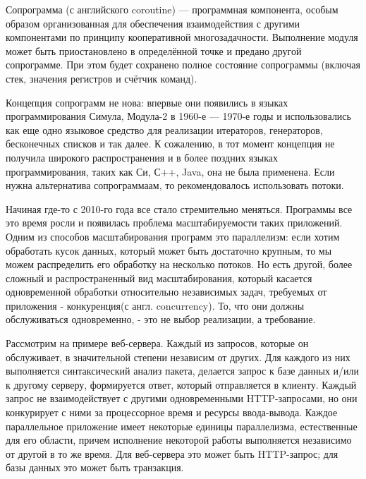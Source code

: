 
	Сопрограмма (с английского coroutine) — программная компонента, особым образом организованная для обеспечения взаимодействия с другими компонентами по принципу кооперативной многозадачности. Выполнение модуля может быть приостановлено в определённой точке и предано другой сопрограмме. При этом будет сохранено полное состояние сопрограммы (включая стек, значения регистров и счётчик команд).
	\par
	Концепция сопрограмм не нова: впервые они появились в языках программирования Симула,
	Модула-2 в 1960-е — 1970-е годы и использовались как еще одно языковое средство для
	реализации итераторов, генераторов, бесконечных списков и так далее. К сожалению, в
	тот момент концепция не получила широкого распространения и в более поздних языках
	программирования, таких как Си, С++, Java, она не была применена. Если нужна
	альтернатива сопрограммаам, то рекомендовалось использовать потоки. 
	\par
	Начиная где-то с 2010-го года все стало стремительно меняться. Программы все это время
	росли и появилась проблема масштабируемости таких приложений. Одним из способов
	масштабирования программ это параллелизм: если хотим обработать кусок данных, который
	может быть достаточно крупным, то мы можем распределить его обработку на несколько потоков. Но есть другой, более сложный и распространенный
	вид масштабирования, который касается одновременной обработки
	относительно независимых задач, требуемых от приложения - конкуренция(с англ. concurrency). То, что они должны обслуживаться одновременно, - это не выбор реализации, а требование.
	\par
	Рассмотрим на примере веб-сервера. Каждый из запросов, которые он обслуживает, в значительной степени
	независим от других. Для каждого из них выполняется синтаксический анализ пакета, делается запрос к базе данных и/или к другому серверу, формируется ответ, который
	отправляется в клиенту. Каждый запрос не взаимодействует с другими одновременными
	HTTP-запросами, но они конкурирует с ними за процессорное время и ресурсы ввода-вывода.
	Каждое параллельное приложение имеет 
	некоторые единицы параллелизма, естественные для его области, причем исполнение 
	некоторой работы выполняется независимо от другой в то же время. Для 
	веб-сервера это может быть HTTP-запрос; для базы данных это может быть транзакция.
	
